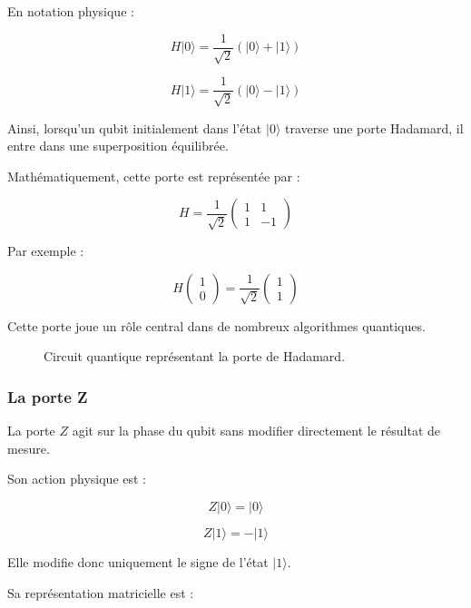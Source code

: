 \documentclass[a4paper,12pt]{article}
\begin{document}
En notation physique :

\[
H|0\rangle
=
\frac{1}{\sqrt{2}}
(|0\rangle+|1\rangle)
\]

\[
H|1\rangle
=
\frac{1}{\sqrt{2}}
(|0\rangle-|1\rangle)
\]

Ainsi, lorsqu’un qubit initialement dans l’état $|0\rangle$ traverse une porte Hadamard, il entre dans une superposition équilibrée.

Mathématiquement, cette porte est représentée par :

\[
H
=
\frac{1}{\sqrt{2}}
\begin{pmatrix}
1 & 1\\
1 & -1
\end{pmatrix}
\]

Par exemple :

\[
H
\begin{pmatrix}
1\\
0
\end{pmatrix}
=
\frac{1}{\sqrt{2}}
\begin{pmatrix}
1\\
1
\end{pmatrix}
\]

Cette porte joue un rôle central dans de nombreux algorithmes quantiques.

\begin{figure}[H]
\centering
{}
\caption{Circuit quantique représentant la porte de Hadamard.}
\end{figure}

\subsubsection{La porte Z}

La porte $Z$ agit sur la phase du qubit sans modifier directement le résultat de mesure.

Son action physique est :

\[
Z|0\rangle
=
|0\rangle
\]

\[
Z|1\rangle
=
-|1\rangle
\]

Elle modifie donc uniquement le signe de l’état $|1\rangle$.

Sa représentation matricielle est :
\end{document}
